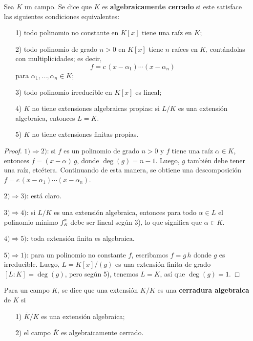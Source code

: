 \begin{proposicion-definicion}
  Sea $K$ un campo. Se dice que $K$ es \textbf{algebraicamente cerrado}
  si este satisface las siguientes condiciones equivalentes:
  \begin{enumerate}
  \item[1)] todo polinomio no constante en $K [x]$ tiene una raíz en $K$;

  \item[2)] todo polinomio de grado $n > 0$ en $K [x]$ tiene $n$ raíces en $K$,
    contándolas con multiplicidades; es decir,
    $$f = c\,(x-\alpha_1)\cdots (x - \alpha_n)$$
    para $\alpha_1,\ldots,\alpha_n \in K$;

  \item[3)] todo polinomio irreducible en $K [x]$ es lineal;

  \item[4)] $K$ no tiene extensiones algebraicas propias: si $L/K$ es una
    extensión algebraica, entonces $L = K$.

  \item[5)] $K$ no tiene extensiones finitas propias.
  \end{enumerate}
  
  \begin{proof}
    $1)\Rightarrow 2)$: si $f$ es un polinomio de grado $n > 0$ y $f$ tiene una
    raíz $\alpha\in K$, entonces $f = (x-\alpha)\,g$, donde
    $\deg (g) = n-1$. Luego, $g$ también debe tener una raíz,
    etcétera. Continuando de esta manera, se obtiene una descomposición
    $f = c\,(x-\alpha_1)\cdots (x - \alpha_n)$.

    $2)\Rightarrow 3)$: está claro.

    $3)\Rightarrow 4)$: si $L/K$ es una extensión algebraica, entonces para todo
    $\alpha \in L$ el polinomio mínimo $f^\alpha_K$ debe ser lineal según 3),
    lo que significa que $\alpha \in K$.

    $4)\Rightarrow 5)$: toda extensión finita es algebraica.

    $5)\Rightarrow 1)$: para un polinomio no constante $f$, escribamos
    $f = g\,h$ donde $g$ es irreducible. Luego, $L = K [x] / (g)$ es una
    extensión finita de grado $[L:K] = \deg (g)$, pero según 5), tenemos
    $L = K$, así que $\deg (g) = 1$.
  \end{proof}
\end{proposicion-definicion}

\begin{definicion}
  Para un campo $K$, se dice que una extensión $\overline{K}/K$ es una
  \textbf{cerradura algebraica} de $K$ si

  \begin{enumerate}
  \item[1)] $\overline{K}/K$ es una extensión algebraica;

  \item[2)] el campo $\overline{K}$ es algebraicamente cerrado.
  \end{enumerate}
\end{definicion}

